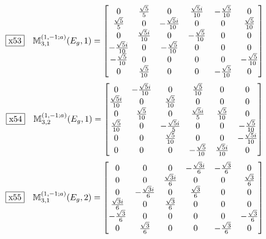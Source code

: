 \documentclass[fleqn,10pt,landscape]{jsarticle}
\begin{document}
\begin{dmath*}
\fbox{x53}\quad \mathbb{M}_{3,1}^{(1,-1;a)}(E_{g},1)=\begin{bmatrix} 0 & \frac{\sqrt{5}}{5} & 0 & \frac{\sqrt{5} i}{10} & - \frac{\sqrt{5}}{10} & 0 \\ \frac{\sqrt{5}}{5} & 0 & - \frac{\sqrt{5} i}{10} & 0 & 0 & \frac{\sqrt{5}}{10} \\ 0 & \frac{\sqrt{5} i}{10} & 0 & - \frac{\sqrt{5}}{10} & 0 & 0 \\ - \frac{\sqrt{5} i}{10} & 0 & - \frac{\sqrt{5}}{10} & 0 & 0 & 0 \\ - \frac{\sqrt{5}}{10} & 0 & 0 & 0 & 0 & - \frac{\sqrt{5}}{10} \\ 0 & \frac{\sqrt{5}}{10} & 0 & 0 & - \frac{\sqrt{5}}{10} & 0 \end{bmatrix}
\end{dmath*}
\begin{dmath*}
\fbox{x54}\quad \mathbb{M}_{3,2}^{(1,-1;a)}(E_{g},1)=\begin{bmatrix} 0 & - \frac{\sqrt{5} i}{10} & 0 & \frac{\sqrt{5}}{10} & 0 & 0 \\ \frac{\sqrt{5} i}{10} & 0 & \frac{\sqrt{5}}{10} & 0 & 0 & 0 \\ 0 & \frac{\sqrt{5}}{10} & 0 & \frac{\sqrt{5} i}{5} & \frac{\sqrt{5}}{10} & 0 \\ \frac{\sqrt{5}}{10} & 0 & - \frac{\sqrt{5} i}{5} & 0 & 0 & - \frac{\sqrt{5}}{10} \\ 0 & 0 & \frac{\sqrt{5}}{10} & 0 & 0 & - \frac{\sqrt{5} i}{10} \\ 0 & 0 & 0 & - \frac{\sqrt{5}}{10} & \frac{\sqrt{5} i}{10} & 0 \end{bmatrix}
\end{dmath*}
\begin{dmath*}
\fbox{x55}\quad \mathbb{M}_{3,1}^{(1,-1;a)}(E_{g},2)=\begin{bmatrix} 0 & 0 & 0 & - \frac{\sqrt{3} i}{6} & - \frac{\sqrt{3}}{6} & 0 \\ 0 & 0 & \frac{\sqrt{3} i}{6} & 0 & 0 & \frac{\sqrt{3}}{6} \\ 0 & - \frac{\sqrt{3} i}{6} & 0 & \frac{\sqrt{3}}{6} & 0 & 0 \\ \frac{\sqrt{3} i}{6} & 0 & \frac{\sqrt{3}}{6} & 0 & 0 & 0 \\ - \frac{\sqrt{3}}{6} & 0 & 0 & 0 & 0 & - \frac{\sqrt{3}}{6} \\ 0 & \frac{\sqrt{3}}{6} & 0 & 0 & - \frac{\sqrt{3}}{6} & 0 \end{bmatrix}
\end{dmath*}
\end{document}
